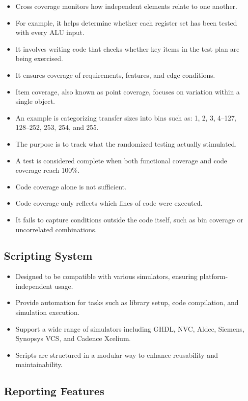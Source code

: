 \documentclass{article}
\begin{document}
\begin{itemize}
  \item Cross coverage monitors how independent elements relate to one another.
  \item For example, it helps determine whether each register set has been tested with every ALU input.
  \item It involves writing code that checks whether key items in the test plan are being exercised.
  \item It ensures coverage of requirements, features, and edge conditions.
  \item Item coverage, also known as point coverage, focuses on variation within a single object.
  \item An example is categorizing transfer sizes into bins such as: 1, 2, 3, 4--127, 128--252, 253, 254, and 255.
  \item The purpose is to track what the randomized testing actually stimulated.
  \item A test is considered complete when both functional coverage and code coverage reach 100\%.
  \item Code coverage alone is not sufficient.
  \item Code coverage only reflects which lines of code were executed.
  \item It fails to capture conditions outside the code itself, such as bin coverage or uncorrelated combinations.
\end{itemize}

\subsection{Scripting System}

\begin{itemize}
  \item Designed to be compatible with various simulators, ensuring platform-independent usage.
  \item Provide automation for tasks such as library setup, code compilation, and simulation execution.
  \item Support a wide range of simulators including GHDL, NVC, Aldec, Siemens, Synopsys VCS, and Cadence Xcelium.
  \item Scripts are structured in a modular way to enhance reusability and maintainability.
\end{itemize}

\subsection{Reporting Features}
\end{document}
